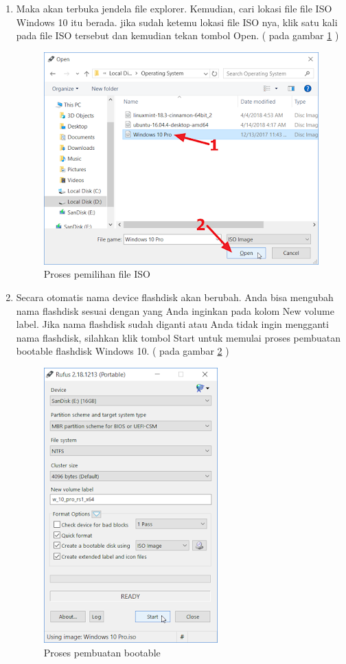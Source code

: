 \begin{enumerate}
  \item Maka akan terbuka jendela file explorer. Kemudian, cari lokasi file file ISO Windows 10 itu berada. jika sudah ketemu lokasi file ISO nya, klik satu kali pada file ISO tersebut dan kemudian tekan tombol Open. ( pada gambar \ref{labelgambar2} )
       \begin{figure}[h!]
	\centering
	\includegraphics[scale=0.4]{figures/2.png}
	\caption{Proses pemilihan file ISO}
	\label{labelgambar2}
	\end{figure}

  \item Secara otomatis nama device flashdisk akan berubah. Anda bisa mengubah nama flashdisk sesuai dengan yang Anda inginkan pada kolom New volume label. Jika nama flashdisk sudah diganti atau Anda tidak ingin mengganti nama flashdisk, silahkan klik tombol Start untuk memulai proses pembuatan bootable flashdisk Windows 10. ( pada gambar \ref{labelgambar3} )
      \begin{figure}[h!]
	\centering
	\includegraphics[scale=0.4]{figures/3.png}
	\caption{Proses pembuatan bootable}
	\label{labelgambar3}
	\end{figure}


\end{enumerate}
